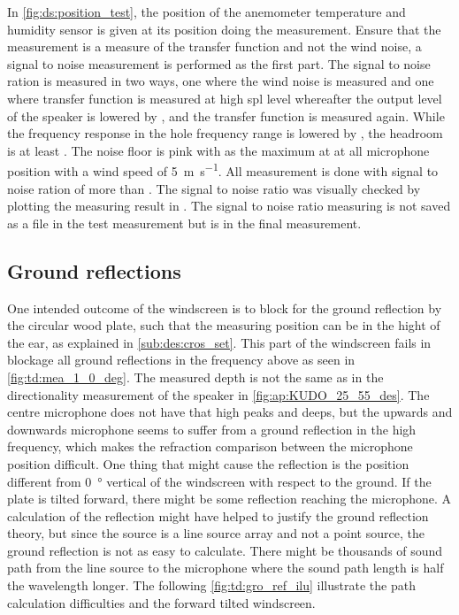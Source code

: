 
In \autoref{fig:ds:position_test}, the position of the anemometer temperature and humidity sensor is given at its position doing the measurement. Ensure that the measurement is a measure of the transfer function and not the wind noise, a signal to noise measurement is performed as the first part. The signal to noise ration is measured in two ways, one where the wind noise is measured and one where transfer function is measured at high \gls{spl} level whereafter the output level of the speaker is lowered by , and the transfer function is measured again. While the frequency response in the hole frequency range is lowered by , the headroom is at least  . The noise floor is pink with  as the maximum at  at all microphone position  with a wind speed of \SI{5}{\meter\per\second}. All measurement is done with signal to noise ration of more than . The signal to noise ratio was visually checked by plotting the measuring result in \matlab. The signal to noise ratio measuring is not saved as a file in the test measurement but is in the final measurement.



\subsection{Ground reflections}\label{sec:des:ground_reflection}
One intended outcome of the windscreen is to block for the ground reflection by the circular wood plate, such that the measuring position can be in the hight of the ear, as explained in \autoref{sub:des:cros_set}. This part of the windscreen fails in blockage all ground reflections in the frequency above  as seen in \autoref{fig:td:mea_1_0_deg}. The measured depth is not the same as in the directionality measurement of the speaker in \autoref{fig:ap:KUDO_25_55_des}. The centre microphone does not have that high peaks and deeps, but the upwards and downwards microphone seems to suffer from a ground reflection in the high frequency, which makes the refraction comparison between the microphone position difficult. One thing that might cause the reflection is the position different from \SI{0}{\degree} vertical of the windscreen with respect to the ground. If the plate is tilted forward, there might be some reflection reaching the microphone. A calculation of the reflection might have helped to justify the ground reflection theory, but since the source is a line source array and not a point source, the ground reflection is not as easy to calculate. There might be thousands of sound path from the line source to the microphone where the sound path length is half the wavelength longer. The following \autoref{fig:td:gro_ref_ilu} illustrate the path calculation difficulties and the forward tilted windscreen. 

